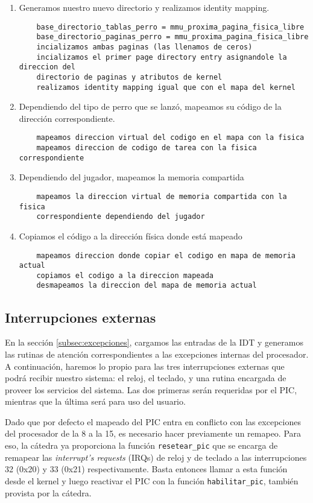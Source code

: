 \begin{enumerate}
	\item Generamos nuestro nuevo directorio y realizamos identity mapping.
	\begin{lstlisting}
	base_directorio_tablas_perro = mmu_proxima_pagina_fisica_libre
	base_directorio_paginas_perro = mmu_proxima_pagina_fisica_libre
	incializamos ambas paginas (las llenamos de ceros)
	incializamos el primer page directory entry asignandole la direccion del
	directorio de paginas y atributos de kernel
	realizamos identity mapping igual que con el mapa del kernel
	\end{lstlisting}
	\item Dependiendo del tipo de perro que se lanzó, mapeamos su código de la
		dirección correspondiente.
	\begin{lstlisting}
	mapeamos direccion virtual del codigo en el mapa con la fisica
	mapeamos direccion de codigo de tarea con la fisica correspondiente
	\end{lstlisting}
	\item Dependiendo del jugador, mapeamos la memoria compartida
	\begin{lstlisting}
	mapeamos la direccion virtual de memoria compartida con la fisica
	correspondiente dependiendo del jugador
	\end{lstlisting}
	\item Copiamos el código a la dirección física donde está mapeado
	\begin{lstlisting}
	mapeamos direccion donde copiar el codigo en mapa de memoria actual
	copiamos el codigo a la direccion mapeada
	desmapeamos la direccion del mapa de memoria actual
	\end{lstlisting}
\end{enumerate}

\subsection{Interrupciones externas}

En la sección \ref{subsec:excepciones}, cargamos las entradas de la IDT y generamos las rutinas de atención correspondientes a las excepciones internas del procesador. A continuación, haremos lo propio para las tres interrupciones externas que podrá recibir nuestro sistema: el reloj, el teclado, y una rutina encargada de proveer los servicios del sistema. Las dos primeras serán requeridas por el PIC, mientras que la última será para uso  del usuario.

Dado que por defecto el mapeado del PIC entra en conflicto con las excepciones del procesador de la 8 a la 15, es necesario hacer previamente un remapeo. Para eso, la cátedra ya proporciona la función \texttt{resetear\_pic} que se encarga de remapear las \textit{interrupt's requests} (IRQs) de reloj y de teclado a las interrupciones 32 (0x20) y 33 (0x21) respectivamente. Basta entonces llamar a esta función desde el kernel y luego reactivar el PIC con la función \texttt{habilitar\_pic}, también provista por la cátedra.

